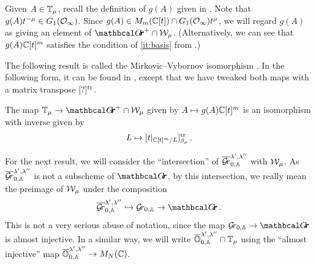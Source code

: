 \documentclass[draft]{article} %
\begin{document}
Given $ A \in \mathbb T_\mu$, recall the definition of $ g(A)$ given in .  Note that $g(A)t^{-\mu} \in G_1(\mathcal O_\infty)$.
Since $ g(A) \in M_m(\mathbb C[t]) \cap G_1(\mathcal O_\infty)t^\mu$, we will regard $ g(A)$ as giving an element of $ \Grth^+ \cap \cW_\mu$.  (Alternatively, we can see that $ g(A) \mathbb C[t]^m$ satisfies the condition of \cref{it:basis} from .)

The following result is called the Mirkovic--Vybornov isomorphism \cite{mirkovic2007quiver}.  In the following form, it can be found in \cite[Theorem 3.2]{cautis2018categorical}, except that we have tweaked both maps with a matrix transpose $[?]^{\mathrm{tr}}$.

% 
\begin{theorem} 
\label{th:TmuWmu}
The map $ \TT_\mu \rightarrow \Grth^+ \cap \cW_\mu $ given by $ A \mapsto g(A)\mathbb C[t]^m $ is an isomorphism with inverse given by
$$ 
L \mapsto [t|_{\mathbb C[t]^m/L} ]^{\mathrm{tr}}_{\beta_\mu} \,. 
$$
\end{theorem}
% 

For the next result, we will consider the ``intersection'' of $ \overline{\mathcal{G}\!r}^{\lambda', \lambda''}_{0,\mathbb A} $ with $\mathcal W_\mu$.  
As $  \overline{\mathcal{G}\!r}^{\lambda', \lambda''}_{0,\mathbb A} $ is not a subscheme of $ \Grth$, by this intersection, we really mean the preimage of $ \mathcal W_\mu$ under the composition
$$ 
    \overline{\Gr}^{\lambda', \lambda''}_{0,\AA}  \hookrightarrow \Grbd \rightarrow \Grth\,.
$$
This is not a very serious abuse of notation, since the map $ \Grbd \rightarrow \Grth $ is almost injective. 
In a similar way, we will write $ \overline{\mathbb O}^{\lambda', \lambda''}_{0,\mathbb A} \cap \mathbb T_\mu$ using the ``almost injective'' 
map $ \overline{\mathbb O}^{\lambda', \lambda''}_{0,\mathbb A} \rightarrow M_N(\mathbb C)$. 
\end{document}

